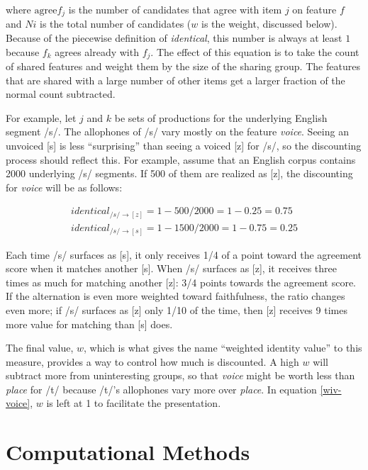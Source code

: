 \documentclass[11pt]{article}
\begin{document}
  \noindent{}where $\textrm{agree}f_{j}$ is the number of candidates that agree
  with item $j$ on feature $f$ and $Ni$ is the total number of
  candidates ($w$ is the weight, discussed below). Because of the
  piecewise definition of \textit{identical}, this number is always at
  least $1$ because $f_k$ agrees already with $f_j$. The effect of
  this equation is to take the count of shared features and weight
  them by the size of the sharing group. The features that are shared
  with a large number of other items get a larger fraction of the normal
  count subtracted.

  For example, let $j$ and $k$ be sets of productions for the
  underlying English segment /s/. The allophones of /s/ vary mostly on the feature
  \textit{voice}. Seeing an unvoiced [s] is less ``surprising'' than
  seeing a voiced [z] for /s/, so the discounting process should
  reflect this. For example, assume that an English corpus contains 2000
  underlying /s/ segments. If 500 of them are realized as [z], the
  discounting for \textit{voice} will be as follows:

  \begin{equation}
    \begin{array}{c}
      identical_{/s/\to[z]} = 1 - 500/2000 = 1 - 0.25 = 0.75 \\
      identical_{/s/\to[s]} = 1 - 1500/2000 = 1 - 0.75 = 0.25
    \end{array}
    \label{wiv-voice}
  \end{equation}

  Each time /s/ surfaces as [s], it only receives 1/4 of a point
  toward the agreement score when it matches another [s]. When /s/
  surfaces as [z], it receives three times as much for matching
  another [z]: 3/4 points towards the agreement score. If the
  alternation is even more weighted toward faithfulness, the ratio
  changes even more; if /s/ surfaces as [z] only 1/10 of the time,
  then [z] receives 9 times more value for matching than [s] does.

  The final value, $w$, which is what gives the name ``weighted
  identity value'' to this measure, provides a way to control how much
  is discounted. A high $w$ will subtract more from uninteresting
  groups, so that \textit{voice} might be worth less than
  \textit{place} for /t/ because /t/'s allophones vary more over
  \textit{place}. In equation \ref{wiv-voice}, $w$ is left at 1 to
  facilitate the presentation.

\section{Computational Methods}
\end{document}
